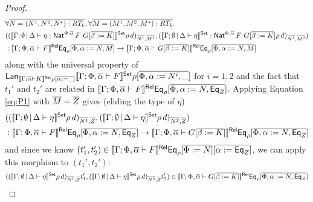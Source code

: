 \documentclass[acmsmall,review,anonymous]{acmart}
\theoremstyle{definition}
\begin{document}
\begin{proof}
    \begin{equation}\label{eq:P1}
    \begin{split}
      &\forall \overline{N = (N^1, N^2, N^*) : RT_k}, 
          \forall \overline{M = (M^1, M^2, M^*) : RT_k}.\\
      &((\llbracket{\Gamma; \emptyset \,|\, \Delta \vdash \eta : \mathsf{Nat}^{\Phi, \overline{\alpha}} \, F \,\, G[\overline{\beta := K}]}\rrbracket^{\mathsf{Set}} \rho \, d)_{\overline{N^1}, \overline{M^1}}, 
      (\llbracket{\Gamma; \emptyset \,|\, \Delta \vdash \eta}\rrbracket^{\mathsf{Set}} : \mathsf{Nat}^{\Phi, \overline{\alpha}} \, F \,\, G[\overline{\beta := K}] \rho \, d)_{\overline{N^2}, \overline{M^2}}) \\
      &: \llbracket{\Gamma; \Phi, \overline{\alpha} \vdash F}\rrbracket^{\mathsf{Rel}}\mathsf{Eq}_{\rho}[\overline{\Phi, \alpha := N, M}]
      \rightarrow \llbracket{\Gamma; \Phi, \overline{\alpha} \vdash
        G[\overline{\beta := K}]}\rrbracket^{\mathsf{Rel}}\mathsf{Eq}_{\rho}[\overline{\Phi, \alpha := N, M}]
    \end{split}
    \end{equation}
along with the universal property of 
$\mathsf{Lan}_{\llbracket{\Gamma; \overline{\alpha} \vdash K}\rrbracket^{\mathsf{Set}}\rho {[\overline{\alpha := \_} ]}}
      \llbracket{\Gamma; \Phi, \overline{\alpha} \vdash F}\rrbracket^{\mathsf{Set}}\rho {[\overline{\Phi, \alpha := N^i, \_} ]}$
      for $i = 1, 2$
and the fact that $t_1'$ and $t_2'$ are related in 
$\llbracket{\Gamma; \Phi, \overline{\alpha} \vdash F}\rrbracket^{\mathsf{Rel}}\mathsf{Eq}_{\rho}[\overline{\Phi, \alpha := N, \mathsf{Eq}_Z}]$.
Applying Equation \eqref{eq:P1} with $\overline{M} = \overline{Z}$ 
gives (eliding the type of $\eta$)
    \begin{equation*}
    \begin{split}
      &((\llbracket{\Gamma; \emptyset \,|\, \Delta \vdash \eta}\rrbracket^{\mathsf{Set}} \rho \, d)_{\overline{N^1}, \overline{Z}}, 
      (\llbracket{\Gamma; \emptyset \,|\, \Delta \vdash \eta}\rrbracket^{\mathsf{Set}} \rho \, d)_{\overline{N^2}, \overline{Z}}) \\
      &: \llbracket{\Gamma; \Phi, \overline{\alpha} \vdash F}\rrbracket^{\mathsf{Rel}}\mathsf{Eq}_{\rho}[\overline{\Phi, \alpha := N, \mathsf{Eq}_Z}]
      \rightarrow \llbracket{\Gamma; \Phi, \overline{\alpha} \vdash
        G[\overline{\beta := K}]}\rrbracket^{\mathsf{Rel}}\mathsf{Eq}_{\rho}[\overline{\Phi, \alpha := N, \mathsf{Eq}_Z}]
    \end{split}
    \end{equation*}
and since we know 
$(t_1',t_2') \in
  \llbracket{\Gamma; \Phi, \overline{\alpha} \vdash F}\rrbracket^{\mathsf{Rel}}\mathsf{Eq}_\rho[\overline{\Phi := N}][\overline{\alpha := \mathsf{Eq}_Z}]$, 
we can apply this morphism
to $(t_1', t_2')$:
\begin{align*}
  ((\llbracket{\Gamma; \emptyset \,|\, \Delta \vdash \eta}\rrbracket^{\mathsf{Set}} \rho \, d)_{\overline{N^1}, \overline{Z}} t_1', 
  (\llbracket{\Gamma; \emptyset \,|\, \Delta \vdash \eta}\rrbracket^{\mathsf{Set}} \rho \, d)_{\overline{N^2}, \overline{Z}} t_2') 
  \in 
\llbracket{\Gamma; \Phi, \overline{\alpha} \vdash
        G[\overline{\beta := K}]}\rrbracket^{\mathsf{Rel}}\mathsf{Eq}_{\rho}[\overline{\Phi, \alpha := N, \mathsf{Eq}_Z}]
\end{align*}

\end{proof}
\end{document}
